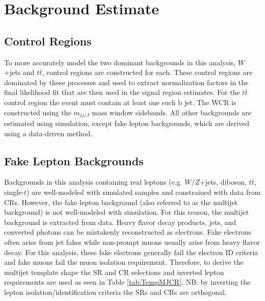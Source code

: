 \section{Background Estimate}
\subsection{Control Regions}
To more accurately model the two dominant backgrounds in this analysis, $W$+jets and $t\bar{t}$, control regions are constructed for each. These control regions are dominated by these processes and used to extract normalization factors in the final likelihood fit that are then used in the signal region estimates. For the $t\bar{t}$ control region the event must contain at least one such b jet. The WCR is constructed using the $m_{jj/J}$ mass window sidebands. All other backgrounds are estimated using simulation, except fake lepton backgrounds, which are derived using a data-driven method.
\subsection{Fake Lepton Backgrounds}
Backgrounds in this analysis containing real leptons (e.g. $W/Z$+jets, diboson, $t\bar{t}$, single-$t$) are well-modeled with simulated samples and constrained with data from CRs. However, the fake lepton background (also referred to as the multijet background) is not well-modeled with simulation. For this reason, the multijet background is extracted from data. Heavy flavor decay products, jets, and converted photons can be mistakenly reconstructed as electrons. Fake electrons often arise from jet fakes while non-prompt muons usually arise from heavy flavor decay.  For this analysis, these fake electrons generally fail the electron ID criteria and fake muons fail the muon isolation requirement. Therefore, to derive the multijet template shape the SR and CR selections and inverted lepton requirements are used as seen in Table \ref{tab:TempMJCR}. NB: by inverting the lepton isolation/identification criteria the SRs and CRs are orthogonal.

